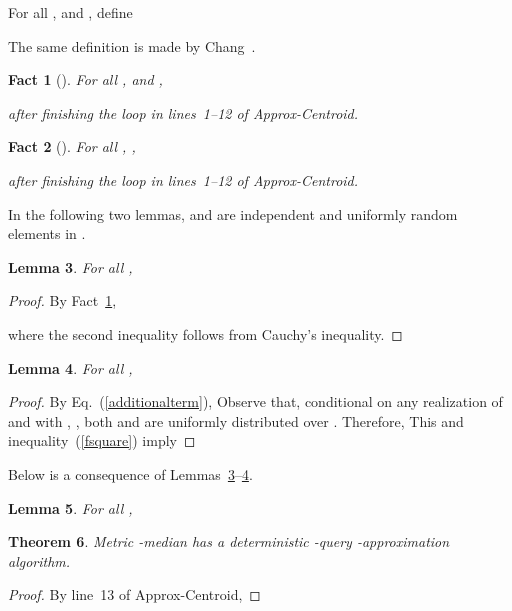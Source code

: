\documentclass[letterpaper,12pt]{article}
\newtheorem{theorem}{Theorem}
\newtheorem{fact}[theorem]{Fact}
\newtheorem{lemma}[theorem]{Lemma}
\begin{document}
{{For all ,  and ,
define

The same definition is made by Chang~\cite{Cha13}.

\begin{fact}[{\cite[Lemma~2]{Cha13}}]\label{pseudodistanceupper}
For all ,  and ,

after finishing the loop in lines~1--12 of {\sf Approx-Centroid}.
\end{fact}

\begin{fact}[{\cite[Lemma~4]{Cha13}}]
For all , ,

after finishing the loop in lines~1--12 of {\sf Approx-Centroid}.
\end{fact}

In the following two lemmas,
 and  are
independent and uniformly random elements in .

\begin{lemma}\label{distancessquareexpected}
For all ,

\end{lemma}
\begin{proof}
By Fact~\ref{pseudodistanceupper},

where the second inequality follows from Cauchy's inequality.
\end{proof}

\begin{lemma}\label{fsquarelemma}
For all ,

\end{lemma}
\begin{proof}
By Eq.~(\ref{additionalterm}),
{\small 
}Observe that,
conditional on any realization
of  and  with , ,
both  and  are uniformly distributed over .
Therefore,
{\small 
}This and inequality~(\ref{fsquare})
imply

\end{proof}


Below is a consequence of
Lemmas~\ref{distancessquareexpected}--\ref{fsquarelemma}.

\begin{lemma}\label{therecomestheratioof16}
For all ,

\end{lemma}

\begin{theorem}
{\sc Metric -median} has a deterministic -query
-approximation algorithm.
\end{theorem}
\begin{proof}
By line~13 of {\sf Approx-Centroid},


\end{proof}}}
\end{document}
